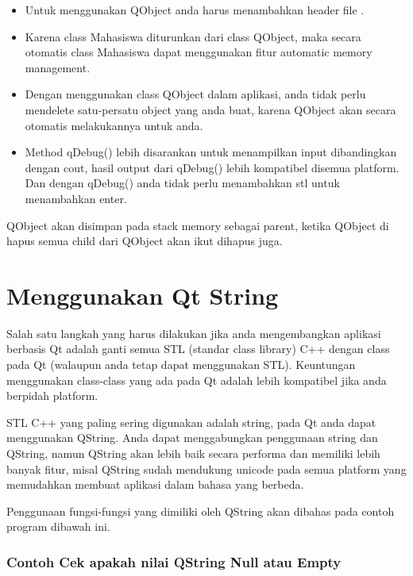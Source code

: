 \begin{itemize}

\item
  Untuk menggunakan QObject anda harus menambahkan header file .
\item
  Karena class Mahasiswa diturunkan dari class QObject, maka secara
  otomatis class Mahasiswa dapat menggunakan fitur automatic memory
  management.
\item
  Dengan menggunakan class QObject dalam aplikasi, anda tidak perlu
  mendelete satu-persatu object yang anda buat, karena QObject akan
  secara otomatis melakukannya untuk anda.
\item
  Method qDebug() lebih disarankan untuk menampilkan input dibandingkan
  dengan cout, hasil output dari qDebug() lebih kompatibel disemua
  platform. Dan dengan qDebug() anda tidak perlu menambahkan stl untuk
  menambahkan enter.
\end{itemize}

QObject akan disimpan pada stack memory sebagai parent, ketika QObject
di hapus semua child dari QObject akan ikut dihapus juga.

\section{Menggunakan Qt String}\label{menggunakan-qt-string}

Salah satu langkah yang harus dilakukan jika anda mengembangkan aplikasi
berbasis Qt adalah ganti semua STL (standar class library) C++ dengan
class pada Qt (walaupun anda tetap dapat menggunakan STL). Keuntungan
menggunakan class-class yang ada pada Qt adalah lebih kompatibel jika
anda berpidah platform.

STL C++ yang paling sering digunakan adalah string, pada Qt anda dapat
menggunakan QString. Anda dapat menggabungkan penggunaan string dan
QString, namun QString akan lebih baik secara performa dan memiliki
lebih banyak fitur, misal QString sudah mendukung unicode pada semua
platform yang memudahkan membuat aplikasi dalam bahasa yang berbeda.

Penggunaan fungsi-fungsi yang dimiliki oleh QString akan dibahas pada
contoh program dibawah ini.

\subsubsection*{Contoh  Cek apakah nilai QString Null atau Empty}

